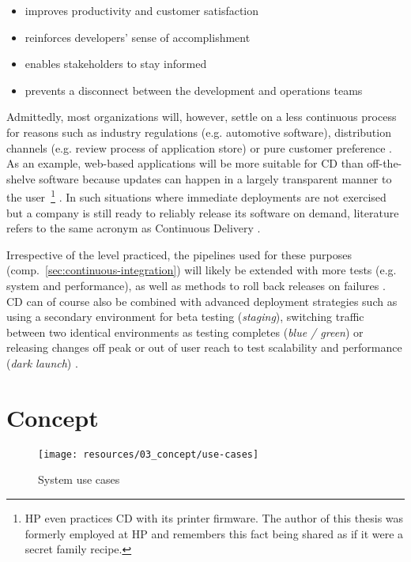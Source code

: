 \begin{appendices}
\begin{itemize}
  \item improves productivity and customer satisfaction
  \item reinforces developers' sense of accomplishment
  \item enables stakeholders to stay informed
  \item prevents a disconnect between the development and operations teams
\end{itemize}

Admittedly, most organizations will, however, settle on a less continuous process for reasons such as industry regulations (e.g. automotive software), distribution channels (e.g. review process of application store) or pure customer preference \cite[pp.~68--69]{leppanen2015highways}. As an example, web-based applications will be more suitable for \ac{CD} than off-the-shelve software because updates can happen in a largely transparent manner to the user~\footnote{\ac*{HP} even practices \ac{CD} with its printer firmware. The author of this thesis was formerly employed at \acs*{HP} and remembers this fact being shared as if it were a secret family recipe.} \cite[p.~22]{savor2016continuous}. In such situations where immediate deployments are not exercised but a company is still ready to reliably release its software on demand, literature refers to the same acronym as Continuous Delivery \cite[p.~50]{chen2015continuous}.

Irrespective of the level practiced, the pipelines used for these purposes (comp.~\autoref{sec:continuous-integration}) will likely be extended with more tests (e.g. system and performance), as well as methods to roll back releases on failures \cite[pp.~52--53]{chen2015continuous}. \ac{CD} can of course also be combined with advanced deployment strategies such as using a secondary environment for beta testing (\textit{staging}), switching traffic between two identical environments as testing completes (\textit{blue / green}) or releasing changes off peak or out of user reach to test scalability and performance (\textit{dark launch}) \cite[p.~23]{savor2016continuous}.


\chapter{Concept}
\label{app:concept}

\begin{figure}[hbt]
  \centering
  \texttt{[image: resources/03\_concept/use-cases]}
  \caption{System use cases}
  \label{fig:system-use-cases}
\end{figure}


\end{appendices}
